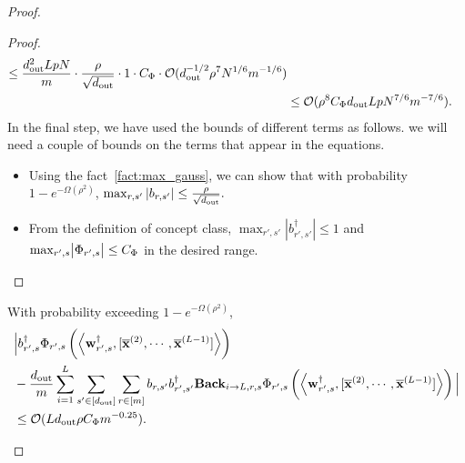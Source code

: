 \begin{claim}
\begin{proof}
\begin{proof}
\begin{align*}
						\le \frac{d_{\mathrm{out}} ^2LpN}{m} \cdot \frac{\rho}{\sqrt{d_{\mathrm{out}} }} \cdot 1 \cdot C_{\Phi} \cdot \mathcal{O}(d_{\mathrm{out}} ^{-1/2} \rho^7 N^{1/6} m^{-1/6}) \\&
						\le \mathcal{O}(\rho^8 C_{\Phi} d_{\mathrm{out}} Lp N^{7/6} m^{-7/6}).
					\end{align*}
					\endgroup
					In the final step, we have used the bounds of different terms as follows.
					we will need a couple of bounds on the terms that appear in the equations.
					\begin{itemize}
						\item Using the fact~\ref{fact:max_gauss}, we can show that with probability $1-e^{-\Omega(\rho^2)}$,
						$\max_{r, s'} | b_{r, s'} | \le \frac{\rho}{\sqrt{d_{\mathrm{out}} }}.$ 
						\item From the definition of concept class,  $\max_{r',s'} | b_{r', s'}^{\dagger} | \le 1$ and $\max_{r', s} \abs{\Phi_{r', s}} \le C_{\Phi}$ in the desired range.
					\end{itemize}
				\end{proof}
				
				
			
			
			
			
			
		
			
			\begin{claim}\label{claim:simplifybig_proof}
				With probability exceeding $1 - e^{-\Omega(\rho^2)}$,
				\begin{align*}
					&\Big|  b_{r', s}^{\dagger}  \Phi_{r', s} \left(\left\langle \mathbf{w}_{r', s}^{\dagger}, [\overline{\mathbf{x}}^{(2)}, \cdots, \overline{\mathbf{x}}^{(L-1)}]\right\rangle\right) \\& - \frac{d_{\mathrm{out}} }{m} \sum_{i=1}^{L}  \sum_{s' \in [d_{\mathrm{out}} ]}  \sum_{r \in [m]}  b_{r, s'} b_{r', s'}^{\dagger} \mathbf{Back}_{i \to L, r, s} \Phi_{r', s} \left(\left\langle \mathbf{w}_{r', s}^{\dagger}, [\overline{\mathbf{x}}^{(2)}, \cdots, \overline{\mathbf{x}}^{(L-1)}]\right\rangle\right) \Big| \\&\le  \mathcal{O}(Ld_{\mathrm{out}}  \rho C_{\Phi} m^{-0.25}).
				\end{align*}
			\end{claim}
			

\end{proof}
\end{claim}
